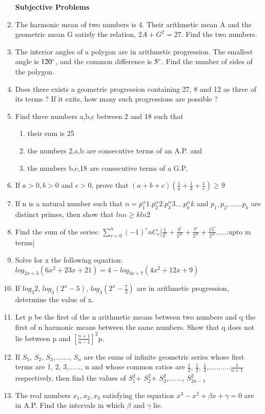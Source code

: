 \begin{enumerate}[label=\arabic*.,ref=\thesubsection.\theenumi]
\textbf {Subjective Problems}

\item The harmonic mean of two numbers is 4. Their arithmetic mean A and the geometric mean G satisfy the relation, $2A+G^2=27$. Find the two numbers.
\item The interior angles of a polygon are in arithmetic progression. The smallest angle is 
$120\degree$, and the common difference is $5\degree$. Find the number of sides of the polygon.
\item Does there exists a geometric progression containing 27, 8 and 12 as three of its terms ? If it exits, how many such progressions are possible ?
\item Find three numbers a,b,c between 2 and 18 such that
\begin{enumerate}
\item their sum is 25 
\item the numbers 2,a,b are consecutive terms of an A.P. and  
\item the numbers b,c,18 are consecutive terms of a G.P.
\end{enumerate}
\item If $a>0,b>0$ and $c>0$, prove that $(a+b+c)(\frac{1}{a}+\frac{1}{b}+\frac{1}{c})\geq9$
\item If n is a natural number such that  $n= p_1^\alpha 1.p_2^\alpha 2.p_3^\alpha 3....p_k^\alpha k$ and $p_1,p_2,......p_k$ are distinct primes, then show that $ln n \geq k ln 2$
\item Find the sum of the series: $\sum_{r=0}^{n}(-1)^r n C_r[\frac{1}{2^r}+\frac{3^r}{2^{2r}}+\frac{7^r}{2^{3r}}+\frac{15^r}{2^{4r}}$......upto m terms]
\item Solve for x the following equation: $log_{2x+3}(6x^2+23x+21)=4-log_{3x+7}(4x^2+12x+9)$
\item If $log_3 2$, $log_3 (2^x-5)$, $log_3 (2^x-\frac{7}{2})$ are in arithmetic progression, determine the value of x.
\item Let p be the first of the n arithmetic means between two numbers and q the first of n harmonic means between the same numbers. Show that q does not lie between p and $[\frac{n+1}{n-1}]^2$p.
\item If $S_1$, $S_2$, $S_3$,......., $S_n$ are the sums of infinite geometric series whose first terms are 1, 2, 3,......, n and whose common ratios are $\frac{1}{2}$, $\frac{1}{3}$, $\frac{1}{4}$,...........$\frac{1}{n+1}$ respectively, then find the values of $S_1^2$+ $S_2^2$+ $S_3^2$,......., $S^2_{2n-1}$
\item The real numbers $x_1,x_2, x_3$ satisfying the equation $x^3-x^2+\beta x+\gamma=0$ are in A.P. Find the intervals in which $\beta$ and $\gamma$ lie.

\end{enumerate}

